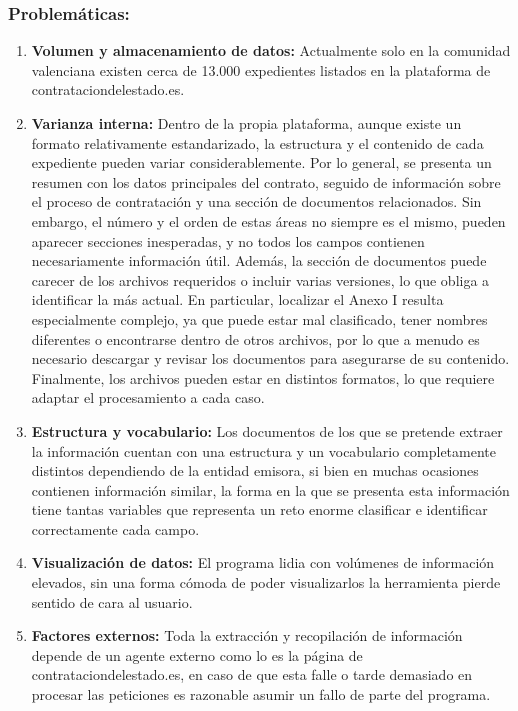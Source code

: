 \documentclass{article}
\begin{document}
\subsubsection{Problemáticas:}
\begin{enumerate}
    \item \textbf{Volumen y almacenamiento de datos:}
    Actualmente solo en la comunidad valenciana existen cerca de 13.000 expedientes listados en la plataforma de contrataciondelestado.es.
    \item \textbf{Varianza interna:}
    Dentro de la propia plataforma, aunque existe un formato relativamente estandarizado, la estructura y el contenido de cada expediente pueden variar considerablemente. Por lo general, se presenta un resumen con los datos principales del contrato, seguido de información sobre el proceso de contratación y una sección de documentos relacionados. Sin embargo, el número y el orden de estas áreas no siempre es el mismo, pueden aparecer secciones inesperadas, y no todos los campos contienen necesariamente información útil. Además, la sección de documentos puede carecer de los archivos requeridos o incluir varias versiones, lo que obliga a identificar la más actual. En particular, localizar el Anexo I resulta especialmente complejo, ya que puede estar mal clasificado, tener nombres diferentes o encontrarse dentro de otros archivos, por lo que a menudo es necesario descargar y revisar los documentos para asegurarse de su contenido. Finalmente, los archivos pueden estar en distintos formatos, lo que requiere adaptar el procesamiento a cada caso.
    
    \item \textbf{Estructura y vocabulario:} 
    Los documentos de los que se pretende extraer la información cuentan con una estructura y un vocabulario completamente distintos dependiendo de la entidad emisora, si bien en muchas ocasiones contienen información similar, la forma en la que se presenta esta información tiene tantas variables que representa un reto enorme clasificar e identificar correctamente cada campo.
    
    \item \textbf{Visualización de datos:} 
    El programa lidia con volúmenes de información elevados, sin una forma cómoda de poder visualizarlos la herramienta pierde sentido de cara al usuario. 
    
    \item \textbf{Factores externos:} 
    Toda la extracción y recopilación de información depende de un agente externo como lo es la página de contrataciondelestado.es, en caso de que esta falle o tarde demasiado en procesar las peticiones es razonable asumir un fallo de parte del programa.


\end{enumerate}
\end{document}
